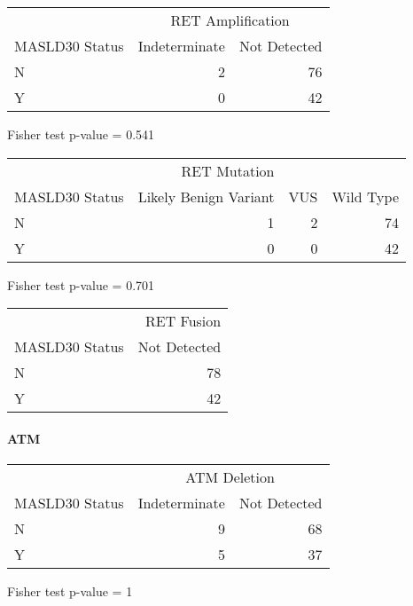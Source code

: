 \documentclass[
]{article}
\begin{document}
\begingroup
\fontsize{12.0pt}{14.4pt}\selectfont
\setlength{\LTpost}{0mm}
\begin{longtable}{l|rr}
\toprule
 & \multicolumn{2}{c}{RET Amplification} \\ 
\cmidrule(lr){2-3}
MASLD30 Status & Indeterminate & Not Detected \\ 
\midrule\addlinespace[2.5pt]
N & 2 & 76 \\ 
Y & 0 & 42 \\ 
\bottomrule
\end{longtable}
\begin{minipage}{\linewidth}
Fisher test p-value =  0.541\\
\end{minipage}
\endgroup

\begingroup
\fontsize{12.0pt}{14.4pt}\selectfont
\setlength{\LTpost}{0mm}
\begin{longtable}{l|rrr}
\toprule
 & \multicolumn{2}{c}{RET Mutation} &  \\ 
\cmidrule(lr){2-3}
MASLD30 Status & Likely Benign Variant & VUS & Wild Type \\ 
\midrule\addlinespace[2.5pt]
N & 1 & 2 & 74 \\ 
Y & 0 & 0 & 42 \\ 
\bottomrule
\end{longtable}
\begin{minipage}{\linewidth}
Fisher test p-value =  0.701\\
\end{minipage}
\endgroup

\begingroup
\fontsize{12.0pt}{14.4pt}\selectfont
\begin{longtable}{l|r}
\toprule
 & RET Fusion \\ 
\cmidrule(lr){2-2}
MASLD30 Status & Not Detected \\ 
\midrule\addlinespace[2.5pt]
N & 78 \\ 
Y & 42 \\ 
\bottomrule
\end{longtable}
\endgroup
\pagebreak

\hypertarget{atm}{%
\paragraph{ATM}\label{atm}}

\begingroup
\fontsize{12.0pt}{14.4pt}\selectfont
\setlength{\LTpost}{0mm}
\begin{longtable}{l|rr}
\toprule
 & \multicolumn{2}{c}{ATM Deletion} \\ 
\cmidrule(lr){2-3}
MASLD30 Status & Indeterminate & Not Detected \\ 
\midrule\addlinespace[2.5pt]
N & 9 & 68 \\ 
Y & 5 & 37 \\ 
\bottomrule
\end{longtable}
\begin{minipage}{\linewidth}
Fisher test p-value =  1\\
\end{minipage}
\endgroup
\end{document}
